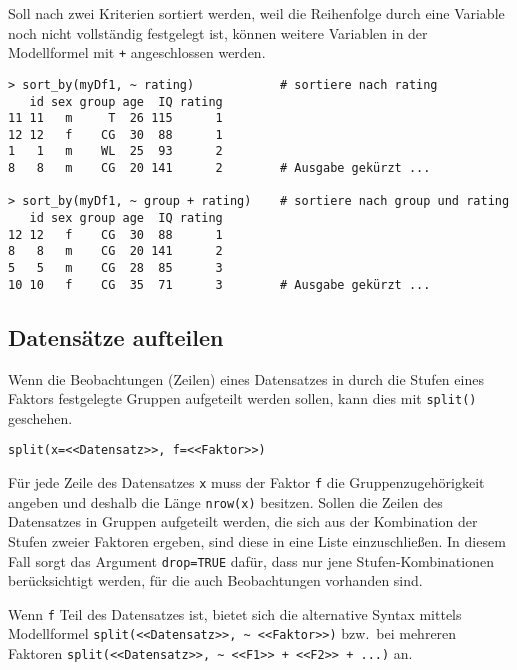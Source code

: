 Soll nach zwei Kriterien sortiert werden, weil die Reihenfolge durch eine Variable noch nicht vollständig festgelegt ist, können weitere Variablen in der Modellformel mit \lstinline!+! angeschlossen werden.
\begin{lstlisting}
> sort_by(myDf1, ~ rating)            # sortiere nach rating
   id sex group age  IQ rating
11 11   m     T  26 115      1
12 12   f    CG  30  88      1
1   1   m    WL  25  93      2
8   8   m    CG  20 141      2        # Ausgabe gekürzt ...

> sort_by(myDf1, ~ group + rating)    # sortiere nach group und rating
   id sex group age  IQ rating
12 12   f    CG  30  88      1
8   8   m    CG  20 141      2
5   5   m    CG  28  85      3
10 10   f    CG  35  71      3        # Ausgabe gekürzt ...
\end{lstlisting}

\subsection{Datensätze aufteilen}
\label{sec:split}

Wenn die Beobachtungen (Zeilen) eines Datensatzes in durch die Stufen eines Faktors festgelegte Gruppen aufgeteilt werden sollen, kann dies mit \lstinline!split()! geschehen.
\begin{lstlisting}
split(x=<<Datensatz>>, f=<<Faktor>>)
\end{lstlisting}

Für jede Zeile des Datensatzes \lstinline!x! muss der Faktor \lstinline!f! die Gruppenzugehörigkeit angeben und deshalb die Länge \lstinline!nrow(x)! besitzen. Sollen die Zeilen des Datensatzes in Gruppen aufgeteilt werden, die sich aus der Kombination der Stufen zweier Faktoren ergeben, sind diese in eine Liste einzuschließen. In diesem Fall sorgt das Argument \lstinline!drop=TRUE! dafür, dass nur jene Stufen-Kombinationen berücksichtigt werden, für die auch Beobachtungen vorhanden sind.

Wenn \lstinline!f! Teil des Datensatzes ist, bietet sich die alternative Syntax mittels Modellformel \lstinline!split(<<Datensatz>>, ~ <<Faktor>>)! bzw.\ bei mehreren Faktoren \lstinline!split(<<Datensatz>>, ~ <<F1>> + <<F2>> + ...)! an.

